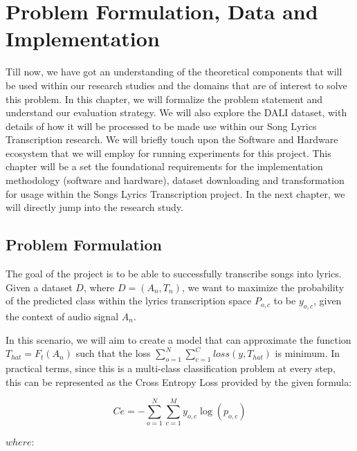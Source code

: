 \chapter{Problem Formulation, Data and Implementation}%
\label{sec:problemdataimplementation}

Till now, we have got an understanding of the theoretical components that will be used within our research studies and the domains that are of interest to solve this problem. In this chapter, we will formalize the problem statement and understand our evaluation strategy. We will also explore the DALI dataset, with details of how it will be processed to be made use within our Song Lyrics Transcription research. We will briefly touch upon the Software and Hardware ecosystem that we will employ for running experiments for this project. This chapter will be a set the foundational requirements for the implementation methodology (software and hardware), dataset downloading and transformation for usage within the Songs Lyrics Transcription project. In the next chapter, we will directly jump into the research study.


\section{Problem Formulation}%
\label{sec:problemformulation}

The goal of the project is to be able to successfully transcribe songs into lyrics. Given a dataset $D$, where $D = (A_n,T_n)$,  we want to maximize the probability of the predicted class within the lyrics transcription space $P_{o,c}$ to be $y_{o,c}$, given the context of audio signal $A_n$. 

In this scenario, we will aim to create a model that can approximate the function $T_{hat} = F_t(A_n)$ such that the loss  $\sum_{o=1}^N \sum_{c=1}^C loss(y, T_{hat})$ is minimum. In practical terms, since this is a multi-class classification problem at every step, this can be represented as the Cross Entropy Loss provided by the given formula:

\begin{equation}
 {C{e}} = -\sum_{o=1}^N \sum_{c=1}^My_{o,c}\log(p_{o,c}) 
\end{equation}

$where : $

